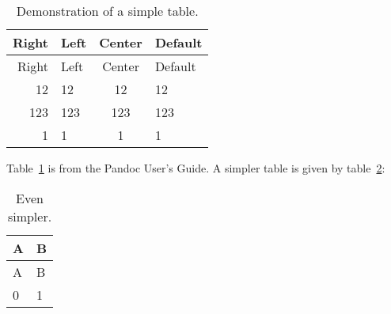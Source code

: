 \providecommand{\crefformat}[2]{}
\providecommand{\Crefformat}[2]{}
\crefformat{table}{table~#2#1#3}
\Crefformat{table}{Table~#2#1#3}

\providecommand{\plusnamesingular}{}
\providecommand{\starnamesingular}{}
\providecommand{\cref}{\plusnamesingular~\ref}
\providecommand{\Cref}{\starnamesingular~\ref}

\begin{longtable}[]{@{}rlcl@{}}
\caption{Demonstration of a simple table. \label{tbl:1}}\tabularnewline
\toprule
Right & Left & Center & Default\tabularnewline
\midrule
\endfirsthead
\toprule
Right & Left & Center & Default\tabularnewline
\midrule
\endhead
12 & 12 & 12 & 12\tabularnewline
123 & 123 & 123 & 123\tabularnewline
1 & 1 & 1 & 1\tabularnewline
\bottomrule
\end{longtable}

\protect\renewcommand{\starnamesingular}{Table}\Cref{tbl:1} is from the
Pandoc User's Guide. A simpler table is given by
\protect\renewcommand{\plusnamesingular}{table}\cref{tbl:2}:

\begin{longtable}[]{@{}ll@{}}
\caption{Even simpler. \label{tbl:2}}\tabularnewline
\toprule
A & B\tabularnewline
\midrule
\endfirsthead
\toprule
A & B\tabularnewline
\midrule
\endhead
0 & 1\tabularnewline
\bottomrule
\end{longtable}
